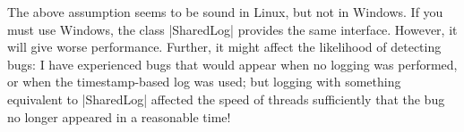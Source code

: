 The above assumption seems to be sound in Linux, but not in Windows.  If you
must use Windows, the class |SharedLog|
provides the same interface.  However, it will give worse performance.
Further, it might affect the likelihood of detecting bugs: I have experienced
bugs that would appear when no logging was performed, or when the
timestamp-based log was used; but logging with something equivalent to
|SharedLog| affected the speed of threads sufficiently that the bug no longer
appeared in a reasonable time!


